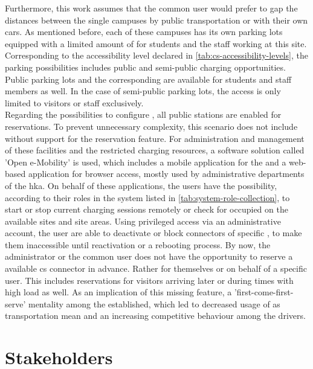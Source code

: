 \noindent Furthermore, this work assumes that the common user would prefer to gap the distances between the single campuses by public transportation or with their own cars.
As mentioned before, each of these campuses has its own parking lots equipped with a limited amount of  for students and the staff working at this site. Corresponding to the accessibility level declared in \ref{tab:cs-accessibility-levels}, the parking possibilities includes public and semi-public charging opportunities.
Public parking lots and the corresponding  are available for students and staff members as well. In the case of semi-public parking lots, the access is only limited to visitors or staff exclusively. \\
Regarding the possibilities to configure , all public stations are enabled for reservations. To prevent unnecessary complexity, this scenario does not include  without support for the reservation feature.
For administration and management of these facilities and the restricted charging resources, a software solution called 'Open e-Mobility' \cite{noauthor_open_2023} is used, which includes a mobile application for the  and a web-based application for browser access, mostly used by administrative departments of the \acrshort{hka}. 
On behalf of these applications, the users have the possibility, according to their roles in the system listed in \ref{tab:system-role-collection}, to start or stop current charging sessions remotely or check for occupied  on the available sites and site areas.
Using privileged access via an administrative account, the user are able to deactivate or block connectors of specific , to make them inaccessible until reactivation or a rebooting process.
By now, the administrator or the common user does not have the opportunity to reserve a available \acrshort{cs} connector in advance. Rather for themselves or on behalf of a specific user. This includes reservations for visitors arriving later or during times with high load as well.
As an implication of this missing feature, a 'first-come-first-serve' mentality among the  established, which led to decreased usage of  as transportation mean and an increasing competitive behaviour among the drivers.

\section{Stakeholders}
\label{ch:Requirements Engineering:sec:Stakeholders}

